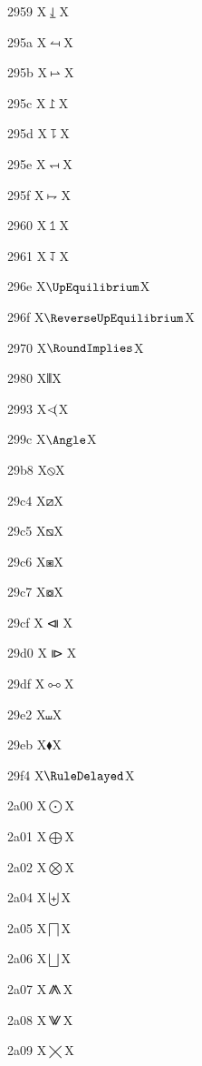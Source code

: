 \documentclass[11pt]{article}
\begin{document}
2959 X{\ensuremath{\LeftDownVectorBar}}X

295a X{\ensuremath{\LeftTeeVector}}X

295b X{\ensuremath{\RightTeeVector}}X

295c X{\ensuremath{\RightUpTeeVector}}X

295d X{\ensuremath{\RightDownTeeVector}}X

295e X{\ensuremath{\DownLeftTeeVector}}X

295f X{\ensuremath{\DownRightTeeVector}}X

2960 X{\ensuremath{\LeftUpTeeVector}}X

2961 X{\ensuremath{\LeftDownTeeVector}}X

296e X{\ensuremath{\UpEquilibrium}}X

296f X{\ensuremath{\ReverseUpEquilibrium}}X

2970 X{\ensuremath{\RoundImplies}}X

2980 X{\ensuremath{\Vvert}}X

2993 X{\ensuremath{<\kern-0.58em(}}X

299c X{\ensuremath{\Angle}}X

29b8 X{\ensuremath{\obslash}}X

29c4 X{\ensuremath{\boxdiag}}X

29c5 X{\ensuremath{\boxbslash}}X

29c6 X{\ensuremath{\boxast}}X

29c7 X{\ensuremath{\boxcircle}}X

29cf X{\ensuremath{\LeftTriangleBar}}X

29d0 X{\ensuremath{\RightTriangleBar}}X

29df X{\ensuremath{\dualmap}}X

29e2 X{\ensuremath{\shuffle}}X

29eb X{\ensuremath{\blacklozenge}}X

29f4 X{\ensuremath{\RuleDelayed}}X

2a00 X{\ensuremath{\bigodot}}X

2a01 X{\ensuremath{\bigoplus}}X

2a02 X{\ensuremath{\bigotimes}}X

2a04 X{\ensuremath{\biguplus}}X

2a05 X{\ensuremath{\bigsqcap}}X

2a06 X{\ensuremath{\bigsqcup}}X

2a07 X{\ensuremath{\conjquant}}X

2a08 X{\ensuremath{\disjquant}}X

2a09 X{\ensuremath{\bigtimes}}X
\end{document}
